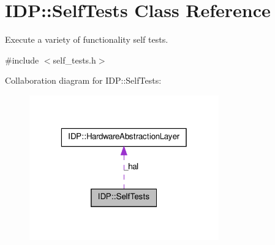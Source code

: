 \hypertarget{classIDP_1_1SelfTests}{
\section{IDP::SelfTests Class Reference}
\label{classIDP_1_1SelfTests}
}


Execute a variety of functionality self tests.  




{\ttfamily \#include $<$self\_\-tests.h$>$}



Collaboration diagram for IDP::SelfTests:\nopagebreak
\begin{figure}[H]
\begin{center}
\leavevmode
\includegraphics[width=232pt]{classIDP_1_1SelfTests__coll__graph}
\end{center}
\end{figure}
